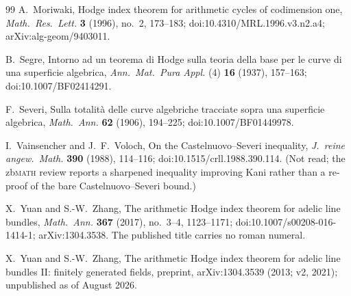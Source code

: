 \documentclass[11pt]{article}
\theoremstyle{definition}
\theoremstyle{remark}
\begin{document}
\begin{thebibliography}{99}
A.~Moriwaki,
Hodge index theorem for arithmetic cycles of codimension one,
\emph{Math.\ Res.\ Lett.} \textbf{3} (1996), no.~2, 173--183;
doi:10.4310/MRL.1996.v3.n2.a4; arXiv:alg-geom/9403011.

B.~Segre,
Intorno ad un teorema di Hodge sulla teoria della base per le curve di una
superficie algebrica,
\emph{Ann.\ Mat.\ Pura Appl.} (4) \textbf{16} (1937), 157--163;
doi:10.1007/BF02414291.

F.~Severi,
Sulla totalit\`a delle curve algebriche tracciate sopra una superficie
algebrica,
\emph{Math.\ Ann.} \textbf{62} (1906), 194--225;
doi:10.1007/BF01449978.

I.~Vainsencher and J.~F.~Voloch,
On the Castelnuovo--Severi inequality,
\emph{J.\ reine angew.\ Math.} \textbf{390} (1988), 114--116;
doi:10.1515/crll.1988.390.114.
(Not read; the zb\textsc{math} review reports a sharpened inequality improving Kani
rather than a re-proof of the bare Castelnuovo--Severi bound.)

X.~Yuan and S.-W.~Zhang,
The arithmetic Hodge index theorem for adelic line bundles,
\emph{Math.\ Ann.} \textbf{367} (2017), no.~3--4, 1123--1171;
doi:10.1007/s00208-016-1414-1; arXiv:1304.3538. The published title carries
no roman numeral.

X.~Yuan and S.-W.~Zhang,
The arithmetic Hodge index theorem for adelic line bundles II: finitely
generated fields,
preprint, arXiv:1304.3539 (2013; v2, 2021); unpublished as of August 2026.

\end{thebibliography}
\end{document}
